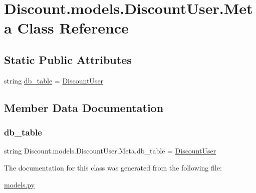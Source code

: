 \hypertarget{class_discount_1_1models_1_1_discount_user_1_1_meta}{}\section{Discount.\+models.\+Discount\+User.\+Meta Class Reference}
\label{class_discount_1_1models_1_1_discount_user_1_1_meta}
\subsection*{Static Public Attributes}
\begin{DoxyCompactItemize}
\item 
string \hyperlink{class_discount_1_1models_1_1_discount_user_1_1_meta_a2dc2167d3b5153012d36145bfa05bd30}{db\+\_\+table} = \textquotesingle{}\hyperlink{class_discount_1_1models_1_1_discount_user}{Discount\+User}\textquotesingle{}
\end{DoxyCompactItemize}


\subsection{Member Data Documentation}
\mbox{\label{class_discount_1_1models_1_1_discount_user_1_1_meta_a2dc2167d3b5153012d36145bfa05bd30}} 
\subsubsection{\texorpdfstring{db\+\_\+table}{db\_table}}
{\footnotesize\ttfamily string Discount.\+models.\+Discount\+User.\+Meta.\+db\+\_\+table = \textquotesingle{}\hyperlink{class_discount_1_1models_1_1_discount_user}{Discount\+User}\textquotesingle{}\hspace{0.3cm}{\ttfamily [static]}}



The documentation for this class was generated from the following file\+:\begin{DoxyCompactItemize}
\item 
\hyperlink{models_8py}{models.\+py}\end{DoxyCompactItemize}
